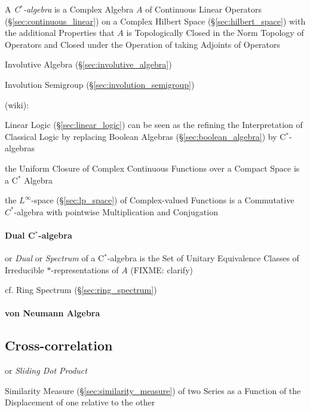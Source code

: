 A \emph{C$^*$-algebra} is a Complex Algebra $A$ of Continuous Linear
Operators (\S\ref{sec:continuous_linear}) on a Complex Hilbert Space
(\S\ref{sec:hilbert_space}) with the additional Properties that $A$ is
Topologically Closed in the Norm Topology of Operators and Closed
under the Operation of taking Adjoints of Operators

Involutive Algebra (\S\ref{sec:involutive_algebra})

Involution Semigroup (\S\ref{sec:involution_semigroup})

(wiki):

Linear Logic (\S\ref{sec:linear_logic}) can be seen as the refining
the Interpretation of Classical Logic by replacing Boolean Algebras
(\S\ref{sec:boolean_algebra}) by C$^*$-algebras

the Uniform Closure of Complex Continuous Functions over a Compact Space is a
C$^*$ Algebra

the $L^\infty$-space (\S\ref{sec:lp_space}) of Complex-valued Functions is a
Commutative $C^*$-algebra with pointwise Multiplication and Conjugation



\paragraph{Dual C$^*$-algebra}\label{sec:cstar_dual}\hfill

or \emph{Dual} or \emph{Spectrum} of a C$^*$-algebra is the Set of Unitary
Equivalence Classes of Irreducible $*$-representations of $A$ (FIXME: clarify)

cf. Ring Spectrum (\S\ref{sec:ring_spectrum})



\paragraph{von Neumann Algebra}\label{sec:vonneumann_algebra}\hfill



\subsection{Cross-correlation}\label{sec:cross_correlation}

or \emph{Sliding Dot Product}

Similarity Measure (\S\ref{sec:similarity_measure}) of two Series as a Function
of the Displacement of one relative to the other

